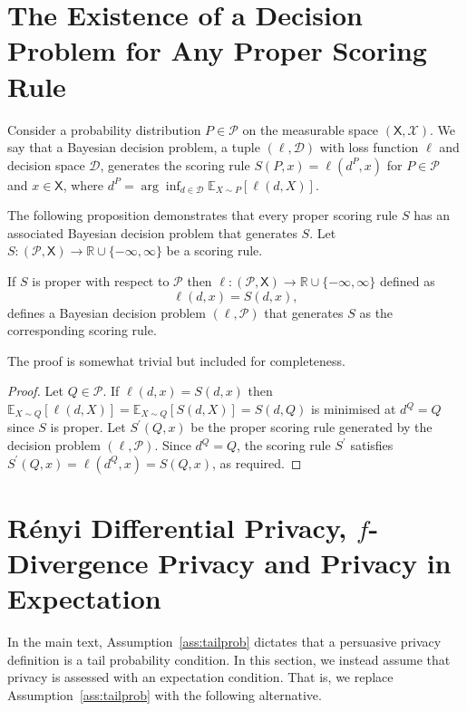 \documentclass{article}
\theoremstyle{plain}
\theoremstyle{plain}
\theoremstyle{definition}
\theoremstyle{remark}
\theoremstyle{plain}
\newcommand{\xset}{\mathsf{X}}
\begin{document}
\section{The Existence of a Decision Problem for Any Proper Scoring Rule}\label{app:proper}

Consider a probability distribution $P \in \mathcal{P}$ on the measurable space $(\xset,\mathcal{X})$. We say that a Bayesian decision problem, a tuple $(\ell,\mathcal{D})$ with loss function $\ell$ and decision space $\mathcal{D}$, generates the scoring rule $S(P,x) = \ell(d^P,x)$ for $P \in \mathcal{P}$ and $x \in \xset$, where $d^P = \arg\inf_{d\in \mathcal{D}}\mathbb{E}_{X\sim P}[\ell(d,X)]$. 
  
 The following proposition demonstrates that every proper scoring rule $S$ has an associated Bayesian decision problem that generates $S$. Let $S:(\mathcal{P},\xset) \rightarrow \mathbb{R} \cup \{-\infty,\infty\}$ be a scoring rule.
\begin{proposition}
    If $S$ is proper with respect to $\mathcal{P}$ then $\ell:(\mathcal{P},\xset)\rightarrow \mathbb{R} \cup \{-\infty,\infty\}$ defined as
    \begin{equation*}
        \ell(d,x) = S(d,x),
    \end{equation*}
    defines a Bayesian decision problem $(\ell,\mathcal{P})$ that generates $S$ as the corresponding scoring rule.
\end{proposition}
The proof is somewhat trivial but included for completeness.
\begin{proof}
    Let $Q \in \mathcal{P}$. If $\ell(d,x) = S(d,x)$ then 
    $\mathbb{E}_{X\sim Q}[\ell(d,X)] = \mathbb{E}_{X\sim Q}[S(d,X)] = S(d,Q)$ is minimised at $d^Q = Q$ since $S$ is proper. Let $S^\prime(Q,x)$ be the proper scoring rule generated by the decision problem $(\ell,\mathcal{P})$. Since $d^Q=Q$, the scoring rule $S^\prime$ satisfies $S^\prime(Q,x) = \ell(d^Q,x) = S(Q,x)$, as required.
\end{proof}
   
\section{R\'{e}nyi Differential Privacy, $f$-Divergence Privacy and Privacy in Expectation}\label{app:renyi}

In the main text, Assumption~\ref{ass:tailprob} dictates that a persuasive privacy definition is a tail probability condition. In this section, we instead assume that privacy is assessed with an expectation condition. That is, we replace Assumption~\ref{ass:tailprob} with the following alternative.
\end{document}
